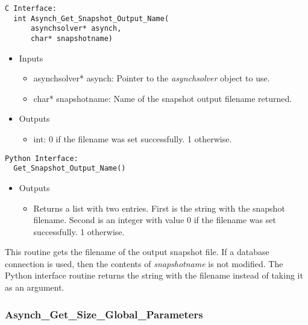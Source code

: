 \documentclass[12pt]{article}
\begin{document}
\begin{lstlisting}[style=CStyle]
  C Interface:
  int Asynch_Get_Snapshot_Output_Name(
      asynchsolver* asynch,
      char* snapshotname)
\end{lstlisting}
\begin{itemize}
 \item Inputs
  \begin{itemize}
   \item asynchsolver* asynch: Pointer to the \emph{asynchsolver} object to use.
   \item char* snapshotname: Name of the snapshot output filename returned.
  \end{itemize}
 \item Outputs
  \begin{itemize}
   \item int: 0 if the filename was set successfully. 1 otherwise.
  \end{itemize}
\end{itemize}
\begin{lstlisting}[style=PythonStyle]
  Python Interface:
  Get_Snapshot_Output_Name()
\end{lstlisting}
\begin{itemize}
 \item Outputs
  \begin{itemize}
   \item Returns a list with two entries. First is the string with the snapshot filename. Second is an integer with value 0 if the filename was set successfully. 1 otherwise.
  \end{itemize}
\end{itemize}
This routine gets the filename of the output snapshot file. If a database connection is used, then the contents of \emph{snapshotname} is not modified. The Python interface routine returns the string with the filename instead of taking it as an argument.


\subsubsection{Asynch\_Get\_Size\_Global\_Parameters} \label{sec: asynch_get_size_global_parameters}
\end{document}
